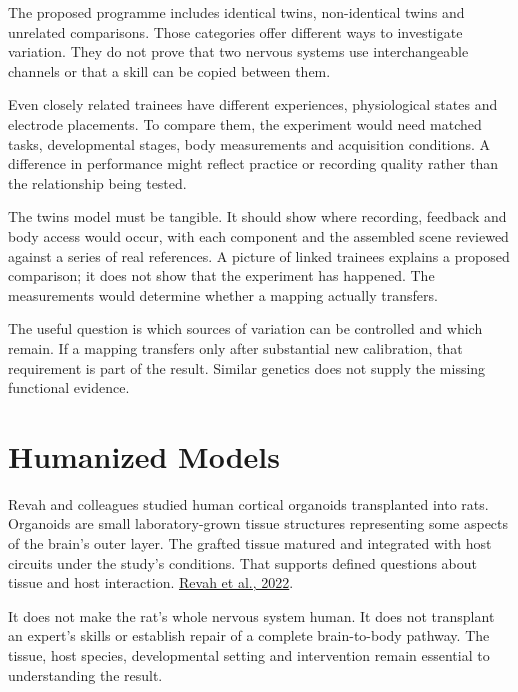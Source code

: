 The proposed programme includes identical twins, non-identical twins and unrelated comparisons. Those categories offer different ways to investigate variation. They do not prove that two nervous systems use interchangeable channels or that a skill can be copied between them.\par

Even closely related trainees have different experiences, physiological states and electrode placements. To compare them, the experiment would need matched tasks, developmental stages, body measurements and acquisition conditions. A difference in performance might reflect practice or recording quality rather than the relationship being tested.\par

The twins model must be tangible. It should show where recording, feedback and body access would occur, with each component and the assembled scene reviewed against a series of real references. A picture of linked trainees explains a proposed comparison; it does not show that the experiment has happened. The measurements would determine whether a mapping actually transfers.\par

The useful question is which sources of variation can be controlled and which remain. If a mapping transfers only after substantial new calibration, that requirement is part of the result. Similar genetics does not supply the missing functional evidence.\par

\section{Humanized Models}

Revah and colleagues studied human cortical organoids transplanted into rats. Organoids are small laboratory-grown tissue structures representing some aspects of the brain's outer layer. The grafted tissue matured and integrated with host circuits under the study's conditions. That supports defined questions about tissue and host interaction. \href{https://www.nature.com/articles/s41586-022-05277-w}{Revah et al., 2022}.\par

It does not make the rat's whole nervous system human. It does not transplant an expert's skills or establish repair of a complete brain-to-body pathway. The tissue, host species, developmental setting and intervention remain essential to understanding the result.\par

